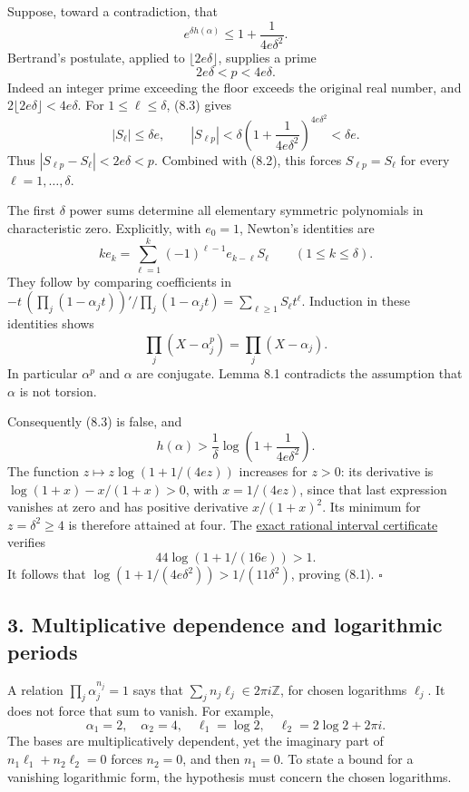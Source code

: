 \documentclass[
  11pt,
  a4paper,
]{article}
\begin{document}
Suppose, toward a contradiction, that \[
e^{\delta h(\alpha)}\le1+\frac1{4e\delta^2}. \tag{8.3}
\] Bertrand's postulate, applied to \(\lfloor2e\delta\rfloor\), supplies
a prime \[
2e\delta<p<4e\delta.
\] Indeed an integer prime exceeding the floor exceeds the original real
number, and \(2\lfloor2e\delta\rfloor<4e\delta\). For
\(1\le\ell\le\delta\), (8.3) gives \[
|S_\ell|\le\delta e,\qquad
|S_{\ell p}|<
\delta\left(1+\frac1{4e\delta^2}\right)^{4e\delta^2}
<\delta e.
\] Thus \(|S_{\ell p}-S_\ell|<2e\delta<p\). Combined with (8.2), this
forces \(S_{\ell p}=S_\ell\) for every \(\ell=1,\ldots,\delta\).

The first \(\delta\) power sums determine all elementary symmetric
polynomials in characteristic zero. Explicitly, with \(e_0=1\), Newton's
identities are \[
ke_k=\sum_{\ell=1}^k(-1)^{\ell-1}e_{k-\ell}S_\ell
\qquad(1\le k\le\delta).
\] They follow by comparing coefficients in
\(-t\,(\prod_j(1-\alpha_jt))'/\prod_j(1-\alpha_jt)
=\sum_{\ell\ge1}S_\ell t^\ell\). Induction in these identities shows \[
\prod_j(X-\alpha_j^p)=\prod_j(X-\alpha_j).
\] In particular \(\alpha^p\) and \(\alpha\) are conjugate. Lemma 8.1
contradicts the assumption that \(\alpha\) is not torsion.

Consequently (8.3) is false, and \[
h(\alpha)>\frac1\delta
\log\left(1+\frac1{4e\delta^2}\right).
\] The function \(z\mapsto z\log(1+1/(4ez))\) increases for \(z>0\): its
derivative is \(\log(1+x)-x/(1+x)>0\), with \(x=1/(4ez)\), since that
last expression vanishes at zero and has positive derivative
\(x/(1+x)^2\). Its minimum for \(z=\delta^2\ge4\) is therefore attained
at four. The \href{https://kokunoyumeto.github.io/open-math-courses-public/courses/TR-BAKER/verification/height_constants.py}{exact rational
interval certificate} verifies \[
44\log(1+1/(16e))>1.
\] It follows that \(\log(1+1/(4e\delta^2))>1/(11\delta^2)\), proving
(8.1). \(\square\)

\subsection{3. Multiplicative dependence and logarithmic
periods}\label{multiplicative-dependence-and-logarithmic-periods}

A relation \(\prod_j\alpha_j^{n_j}=1\) says that
\(\sum_j n_j\ell_j\in2\pi i\mathbb Z\), for chosen logarithms
\(\ell_j\). It does not force that sum to vanish. For example, \[
\alpha_1=2,\quad\alpha_2=4,\quad
\ell_1=\log2,\quad\ell_2=2\log2+2\pi i.
\] The bases are multiplicatively dependent, yet the imaginary part of
\(n_1\ell_1+n_2\ell_2=0\) forces \(n_2=0\), and then \(n_1=0\). To state
a bound for a vanishing logarithmic form, the hypothesis must concern
the chosen logarithms.
\end{document}
